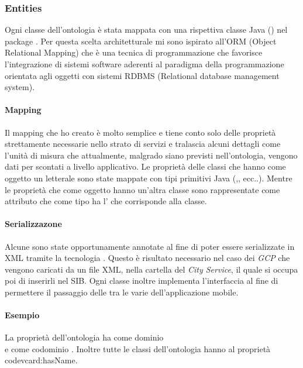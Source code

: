 
\subsubsection{Entities}

Ogni classe dell'ontologia è stata mappata con una rispettiva classe Java () nel package  . Per questa scelta architetturale mi sono ispirato all'ORM (Object Relational Mapping) che è una tecnica di programmazione che favorisce l'integrazione di sistemi software aderenti al paradigma della programmazione orientata agli oggetti con sistemi RDBMS (Relational database management system). %

\paragraph{Mapping} Il mapping che ho creato è molto semplice e tiene conto solo delle proprietà strettamente necessarie nello strato di servizi e tralascia alcuni dettagli come l'unità di misura che attualmente, malgrado siano previsti nell'ontologia, vengono dati per scontati a livello applicativo.
Le proprietà delle classi che hanno come oggetto un letterale sono state mappate con tipi primitivi Java (,, ecc..). Mentre le proprietà che come oggetto hanno un'altra classe sono rappresentate come attributo che come tipo ha l'
che corrisponde alla classe. 

\paragraph{Serializzazone} Alcune  sono state opportunamente annotate al fine di poter essere serializzate in XML tramite la tecnologia . Questo è risultato necessario nel caso dei \emph{GCP} che vengono caricati da un file XML, nella cartella del \emph{City Service}, il quale si occupa poi di inserirli nel SIB. Ogni classe inoltre implementa l'interfaccia  al fine di permettere il passaggio delle  tra le varie  dell'applicazione mobile.

\paragraph{Esempio}

La proprietà dell'ontologia  ha come dominio \\  e come codominio . Inoltre tutte le classi dell'ontologia hanno al proprietà code{vcard:hasName}.


